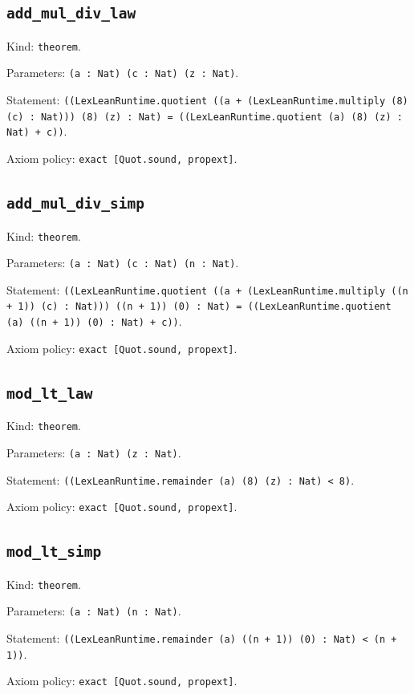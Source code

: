 \documentclass[11pt]{article}
\begin{document}
\subsection*{\texttt{add\_mul\_div\_law}}
\noindent Kind: \texttt{theorem}.\par
\noindent Parameters: \texttt{(a : Nat) (c : Nat) (z : Nat)}.\par
\noindent Statement: \texttt{((LexLeanRuntime.quotient ((a + (LexLeanRuntime.multiply (8) (c) : Nat))) (8) (z) : Nat) = ((LexLeanRuntime.quotient (a) (8) (z) : Nat) + c))}.\par
\noindent Axiom policy: \texttt{exact [Quot.sound, propext]}.\par
\subsection*{\texttt{add\_mul\_div\_simp}}
\noindent Kind: \texttt{theorem}.\par
\noindent Parameters: \texttt{(a : Nat) (c : Nat) (n : Nat)}.\par
\noindent Statement: \texttt{((LexLeanRuntime.quotient ((a + (LexLeanRuntime.multiply ((n + 1)) (c) : Nat))) ((n + 1)) (0) : Nat) = ((LexLeanRuntime.quotient (a) ((n + 1)) (0) : Nat) + c))}.\par
\noindent Axiom policy: \texttt{exact [Quot.sound, propext]}.\par
\subsection*{\texttt{mod\_lt\_law}}
\noindent Kind: \texttt{theorem}.\par
\noindent Parameters: \texttt{(a : Nat) (z : Nat)}.\par
\noindent Statement: \texttt{((LexLeanRuntime.remainder (a) (8) (z) : Nat) < 8)}.\par
\noindent Axiom policy: \texttt{exact [Quot.sound, propext]}.\par
\subsection*{\texttt{mod\_lt\_simp}}
\noindent Kind: \texttt{theorem}.\par
\noindent Parameters: \texttt{(a : Nat) (n : Nat)}.\par
\noindent Statement: \texttt{((LexLeanRuntime.remainder (a) ((n + 1)) (0) : Nat) < (n + 1))}.\par
\noindent Axiom policy: \texttt{exact [Quot.sound, propext]}.\par
\end{document}
